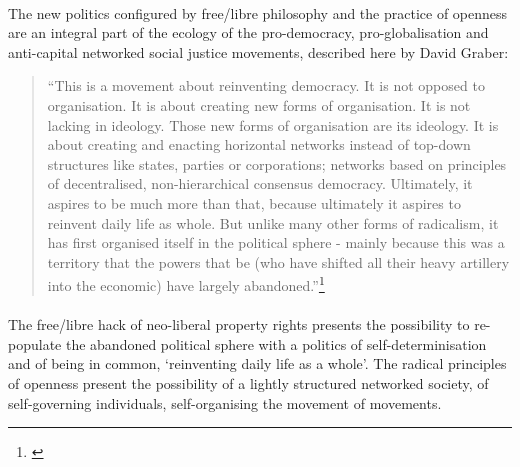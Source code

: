 \paragraph{}The new politics configured by free/libre philosophy and the practice of openness are an integral part of the ecology of the pro-democracy, pro-globalisation and anti-capital networked social justice movements, described here by David Graber:
\begin{quote}``This is a movement about reinventing democracy. It is not opposed to organisation. It is about creating new forms of organisation. It is not lacking in ideology. Those new forms of organisation are its ideology. It is about creating and enacting horizontal networks instead of top-down structures like states, parties or corporations; networks based on principles of decentralised, non-hierarchical consensus democracy. Ultimately, it aspires to be much more than that, because ultimately it aspires to reinvent daily life as whole. But unlike many other forms of radicalism, it has first organised itself in the political sphere - mainly because this was a territory that the powers that be (who have shifted all their heavy artillery into the economic) have largely abandoned.''\footnote{\cite{Graeber:2002}}
\end{quote}

\paragraph{}The free/libre hack of neo-liberal property rights presents the possibility to re-populate the abandoned political sphere with a politics of self-determinisation and of being in common, `reinventing daily life as a whole'. The radical principles of openness present the possibility of a lightly structured networked society, of self-governing individuals, self-organising the movement of movements.